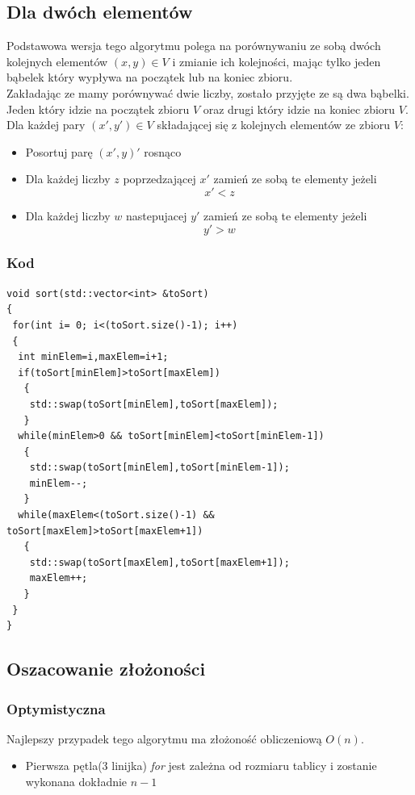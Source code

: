 \subsection{Dla dwóch elementów}
Podstawowa wersja tego algorytmu polega na porównywaniu ze sobą dwóch kolejnych elementów $(x,y) \in V$ i zmianie ich kolejności, mając tylko jeden bąbelek który wypływa na początek lub na koniec zbioru. \\
Zakładając ze mamy porównywać dwie liczby, zostało przyjęte ze są dwa bąbelki. Jeden który idzie na początek zbioru  $V$ oraz drugi który idzie na koniec zbioru $V$. \\
Dla każdej pary $(x',y') \in V$ składającej się z kolejnych elementów ze zbioru $V$:
\begin{itemize} 
\item Posortuj parę $(x',y)'$ rosnąco
\item Dla każdej liczby $z$ poprzedzającej $x'$ zamień ze sobą te elementy jeżeli \begin{equation*}x' < z\end{equation*} 
\item  Dla każdej liczby $w$ nastepujacej $y'$ zamień ze sobą te elementy jeżeli  \begin{equation*}y'>w\end{equation*}
 \end{itemize}  

\subsubsection*{Kod}

\begin{lstlisting}[caption={Sortowanie babelkowe dla par},label={lst:babelek}]
void sort(std::vector<int> &toSort)
{
 for(int i= 0; i<(toSort.size()-1); i++)
 {
  int minElem=i,maxElem=i+1;
  if(toSort[minElem]>toSort[maxElem])
   {
    std::swap(toSort[minElem],toSort[maxElem]);
   }
  while(minElem>0 && toSort[minElem]<toSort[minElem-1])
   {
    std::swap(toSort[minElem],toSort[minElem-1]);
    minElem--;
   }
  while(maxElem<(toSort.size()-1) && toSort[maxElem]>toSort[maxElem+1])
   {
    std::swap(toSort[maxElem],toSort[maxElem+1]);
    maxElem++;
   } 
 }
}
\end{lstlisting}
 \subsection*{Oszacowanie złożoności}

\subsubsection*{Optymistyczna}
Najlepszy przypadek tego algorytmu ma złożoność obliczeniową $O(n)$. 
\begin{itemize}
\item Pierwsza pętla(3 linijka) \textit{for} jest zależna od rozmiaru tablicy i zostanie wykonana dokładnie $n-1$
\end{itemize}

